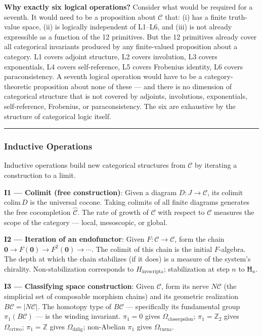 \documentclass[12pt,a4paper]{article}
\begin{document}
\textbf{Why exactly six logical operations?} Consider what would be required for a seventh. It would need to be a proposition about $\mathcal{C}$ that: (i) has a finite truth-value space, (ii) is logically independent of L1--L6, and (iii) is not already expressible as a function of the 12 primitives. But the 12 primitives already cover all categorical invariants produced by any finite-valued proposition about a category. L1 covers adjoint structure, L2 covers involution, L3 covers exponentials, L4 covers self-reference, L5 covers Frobenius identity, L6 covers paraconsistency. A seventh logical operation would have to be a category-theoretic proposition about none of these --- and there is no dimension of categorical structure that is not covered by adjoints, involutions, exponentials, self-reference, Frobenius, or paraconsistency. The six are exhaustive by the structure of categorical logic itself.

\begin{center}
\rule{0.5\textwidth}{0.4pt}
\end{center}

\subsubsection{Inductive Operations}
Inductive operations build new categorical structures from $\mathcal{C}$ by iterating a construction to a limit.

\textbf{I1 --- Colimit (free construction)}: Given a diagram $D: J \to \mathcal{C}$, its colimit $\text{colim}\, D$ is the universal cocone. Taking colimits of all finite diagrams generates the free cocompletion $\hat{\mathcal{C}}$. The rate of growth of $\hat{\mathcal{C}}$ with respect to $\mathcal{C}$ measures the scope of the category --- local, mesoscopic, or global.

\textbf{I2 --- Iteration of an endofunctor}: Given $F: \mathcal{C} \to \mathcal{C}$, form the chain $\mathbf{0} \to F(\mathbf{0}) \to F^2(\mathbf{0}) \to \cdots$. The colimit of this chain is the initial $F$-algebra. The depth at which the chain stabilizes (if it does) is a measure of the system's chirality. Non-stabilization corresponds to $H_{\text{invscripta}}$; stabilization at step $n$ to $Ħ_n$.

\textbf{I3 --- Classifying space construction}: Given $\mathcal{C}$, form its nerve $N\mathcal{C}$ (the simplicial set of composable morphism chains) and its geometric realization $B\mathcal{C} = |N\mathcal{C}|$. The homotopy type of $B\mathcal{C}$ --- specifically its fundamental group $\pi_1(B\mathcal{C})$ --- is the winding invariant. $\pi_1 = 0$ gives $\Omega_{\text{closeepsilon}}$; $\pi_1 = \mathbb{Z}_2$ gives $\Omega_{\text{crtwo}}$; $\pi_1 = \mathbb{Z}$ gives $\Omega_{\text{dzlig}}$; non-Abelian $\pi_1$ gives $\Omega_{\text{turna}}$.
\end{document}
